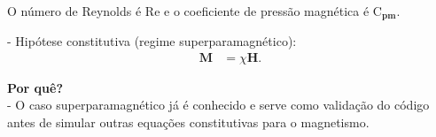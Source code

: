 \documentclass[portrait,a0paper,fontscale=0.40]{baposter} %
\begin{document}
\begin{poster}
{\paragraph{} O número de Reynolds é $\mathrm{Re}$ e o coeficiente de pressão magnética é $\mathrm{C}_{\mathbf{pm}}$.

- Hipótese constitutiva (regime superparamagnético): \begin{align}
	\mathbf{M} &= \chi \mathbf{H}.
\end{align}

\textbf{Por quê?}\\
 - O caso superparamagnético já é conhecido e serve como validação do código antes de simular outras equações constitutivas para o magnetismo.\\ %
}



\end{poster}
\end{document}
